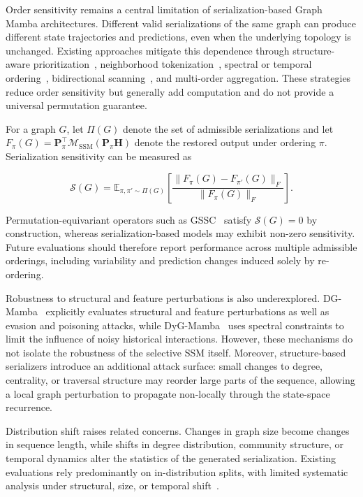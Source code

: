\documentclass[acmsmall]{acmart}
\begin{document}
Order sensitivity remains a central limitation of serialization-based Graph
Mamba architectures. Different valid serializations of the same graph can
produce different state trajectories and predictions, even when the underlying
topology is unchanged. Existing approaches mitigate this dependence through
structure-aware prioritization~\cite{wang2024graph}, neighborhood
tokenization~\cite{behrouz2024graph}, spectral or temporal
ordering~\cite{zhao2024grassnet,choi2024spot}, bidirectional
scanning~\cite{behrouz2024graph,dong2024hamba}, and multi-order aggregation.
These strategies reduce order sensitivity but generally add computation and do
not provide a universal permutation guarantee.

For a graph $G$, let $\Pi(G)$ denote the set of admissible serializations and
let
$F_{\pi}(G)=
\mathbf{P}_{\pi}^{\top}
\mathcal{M}_{\mathrm{SSM}}
(\mathbf{P}_{\pi}\mathbf{H})$
denote the restored output under ordering $\pi$. Serialization sensitivity can
be measured as

\begin{equation}
\label{eq:order-sensitivity}
\mathcal{S}(G)
=
\mathbb{E}_{\pi,\pi'\sim\Pi(G)}
\left[
\frac{
\lVert F_{\pi}(G)-F_{\pi'}(G)\rVert_F
}{
\lVert F_{\pi}(G)\rVert_F
}
\right].
\end{equation}

Permutation-equivariant operators such as GSSC~\cite{huang2024can} satisfy
$\mathcal{S}(G)=0$ by construction, whereas serialization-based models may
exhibit non-zero sensitivity. Future evaluations should therefore report
performance across multiple admissible orderings, including variability and
prediction changes induced solely by re-ordering.

Robustness to structural and feature perturbations is also underexplored.
DG-Mamba~\cite{yuan2025dg} explicitly evaluates structural and feature
perturbations as well as evasion and poisoning attacks, while
DyG-Mamba~\cite{li2024dyg} uses spectral constraints to limit the influence of
noisy historical interactions. However, these mechanisms do not isolate the
robustness of the selective SSM itself. Moreover, structure-based serializers
introduce an additional attack surface: small changes to degree, centrality,
or traversal structure may reorder large parts of the sequence, allowing a
local graph perturbation to propagate non-locally through the state-space
recurrence.

Distribution shift raises related concerns. Changes in graph size become
changes in sequence length, while shifts in degree distribution, community
structure, or temporal dynamics alter the statistics of the generated
serialization. Existing evaluations rely predominantly on in-distribution
splits, with limited systematic analysis under structural, size, or temporal
shift~\cite{li2025ood,gui2022good}.
\end{document}

